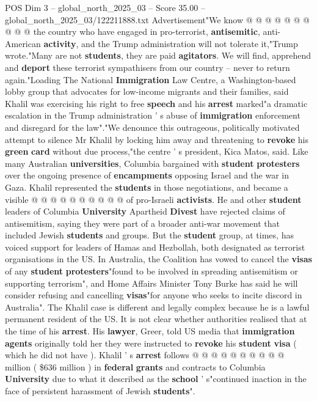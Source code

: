 \begin{textsample}{POS Dim 3 – global\_north\_2025\_03 – Score 35.00 – global\_north\_2025\_03/122211888.txt}
Advertisement"We know @ @ @ @ @ @ @ @ @ @ the country who have engaged in pro-terrorist, \textbf{antisemitic}, anti-American \textbf{activity}, and the Trump administration will not tolerate it,"Trump wrote."Many are not \textbf{students}, they are paid \textbf{agitators}.
We will find, apprehend and \textbf{deport} these terrorist sympathisers from our country -- never to return again."Loading The National \textbf{Immigration} Law Centre, a Washington-based lobby group that advocates for low-income migrants and their families, said Khalil was exercising his right to free \textbf{speech} and his \textbf{arrest} marked"a dramatic escalation in the Trump administration ' s abuse of \textbf{immigration} enforcement and disregard for the law"."We denounce this outrageous, politically motivated attempt to silence Mr Khalil by locking him away and threatening to \textbf{revoke} his \textbf{green} \textbf{card} without due process,"the centre ' s president, Kica Matos, said.
Like many Australian \textbf{universities}, Columbia bargained with \textbf{student} \textbf{protesters} over the ongoing presence of \textbf{encampments} opposing Israel and the war in Gaza.
Khalil represented the \textbf{students} in those negotiations, and became a visible @ @ @ @ @ @ @ @ @ @ of pro-Israeli \textbf{activists}.
He and other \textbf{student} leaders of Columbia \textbf{University} Apartheid \textbf{Divest} have rejected claims of antisemitism, saying they were part of a broader anti-war movement that included Jewish \textbf{students} and groups.
But the \textbf{student} group, at times, has voiced support for leaders of Hamas and Hezbollah, both designated as terrorist organisations in the US.
In Australia, the Coalition has vowed to cancel the \textbf{visas} of any \textbf{student} \textbf{protesters}"found to be involved in spreading antisemitism or supporting terrorism", and Home Affairs Minister Tony Burke has said he will consider refusing and cancelling \textbf{visas}"for anyone who seeks to incite discord in Australia".
The Khalil case is different and legally complex because he is a lawful permanent resident of the US.
It is not clear whether authorities realised that at the time of his \textbf{arrest}.
His \textbf{lawyer}, Greer, told US media that \textbf{immigration} \textbf{agents} originally told her they were instructed to \textbf{revoke} his \textbf{student} \textbf{visa} ( which he did not have ).
Khalil ' s \textbf{arrest} follows @ @ @ @ @ @ @ @ @ @ million ( \$636 million ) in \textbf{federal} \textbf{grants} and contracts to Columbia \textbf{University} due to what it described as the \textbf{school} ' s"continued inaction in the face of persistent harassment of Jewish \textbf{students}".

\end{textsample}
